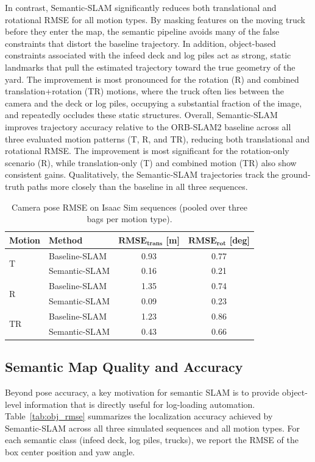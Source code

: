 \documentclass[letterpaper, 10 pt, conference]{IEEEtran}  %
\begin{document}
In contrast, Semantic-SLAM significantly reduces both translational and rotational RMSE for all motion types. By masking features on the moving truck before they enter the map, the semantic pipeline avoids many of the false constraints that distort the baseline trajectory. In addition, object-based constraints associated with the infeed deck and log piles act as strong, static landmarks that pull the estimated trajectory toward the true geometry of the yard. The improvement is most pronounced for the rotation (R) and combined translation+rotation (TR) motions, where the truck often lies between the camera and the deck or log piles, occupying a substantial fraction of the image, and repeatedly occludes these static structures. Overall, Semantic-SLAM improves trajectory accuracy relative to the ORB-SLAM2 baseline across all three evaluated motion patterns (T, R, and TR), reducing both translational and rotational RMSE. The improvement is most significant for the rotation-only scenario (R), while translation-only (T) and combined motion (TR) also show consistent gains. Qualitatively, the Semantic-SLAM trajectories track the ground-truth paths more closely than the baseline in all three sequences.

\begin{table}[t]
\centering
\caption{Camera pose RMSE on Isaac Sim sequences (pooled over three bags per motion type).}
\label{tab:pose_rmse}
\setlength{\tabcolsep}{5pt}
\renewcommand{\arraystretch}{1.12}
\begin{tabular}{llcc}
\toprule
\textbf{Motion} & \textbf{Method} & $\mathbf{RMSE_{trans}}$ \textbf{[m]} & $\mathbf{RMSE_{rot}}$ \textbf{[deg]} \\
\midrule
\multirow{2}{*}{T}  & Baseline-SLAM & 0.93 & 0.77 \\
                   & Semantic-SLAM & 0.16 & 0.21 \\
\midrule
\multirow{2}{*}{R}  & Baseline-SLAM & 1.35 & 0.74 \\
                   & Semantic-SLAM & 0.09 & 0.23 \\
\midrule
\multirow{2}{*}{TR} & Baseline-SLAM & 1.23 & 0.86 \\
                   & Semantic-SLAM & 0.43 & 0.66 \\
\bottomrule
\end{tabular}
\end{table}

\subsection{Semantic Map Quality and Accuracy}
Beyond pose accuracy, a key motivation for semantic SLAM is to provide object-level information that is directly useful for log-loading automation. Table~\ref{tab:obj_rmse} summarizes the localization accuracy achieved by Semantic-SLAM across all three simulated sequences and all motion types. For each semantic class (infeed deck, log piles, trucks), we report the RMSE of the box center position and yaw angle.
\end{document}
